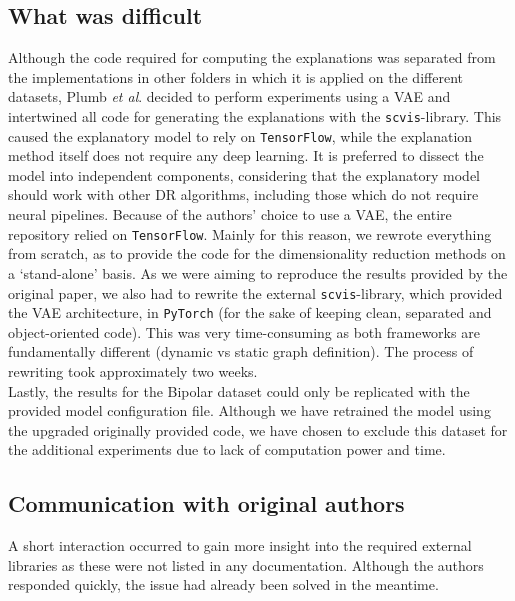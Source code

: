 \subsection{What was difficult}
Although the code required for computing the explanations was separated from the implementations in other folders in which it is applied on the different datasets, Plumb \textit{et al}. decided to perform experiments using a VAE and intertwined all code for generating the explanations with the \texttt{scvis}-library. This caused the explanatory model to rely on \texttt{TensorFlow}, while the explanation method itself does not require any deep learning. It is preferred to dissect the model into independent components, considering that the explanatory model should work with other DR algorithms, including those which do not require neural pipelines. Because of the authors' choice to use a VAE, the entire repository relied on \texttt{TensorFlow}. Mainly for this reason, we rewrote everything from scratch, as to provide the code for the dimensionality reduction methods on a `stand-alone' basis. As we were aiming to reproduce the results provided by the original paper, we also had to rewrite the external \texttt{scvis}-library, which provided the VAE architecture, in \texttt{PyTorch} (for the sake of keeping clean, separated and object-oriented code). This was very time-consuming as both frameworks are fundamentally different (dynamic vs static graph definition). The process of rewriting took approximately two weeks.\\

Lastly, the results for the Bipolar dataset could only be replicated with the provided model configuration file. Although we have retrained the model using the upgraded originally provided code, we have chosen to exclude this dataset for the additional experiments due to lack of computation power and time.

\subsection{Communication with original authors}
A short interaction occurred to gain more insight into the required external libraries as these were not listed in any documentation. Although the authors responded quickly, the issue had already been solved in the meantime.